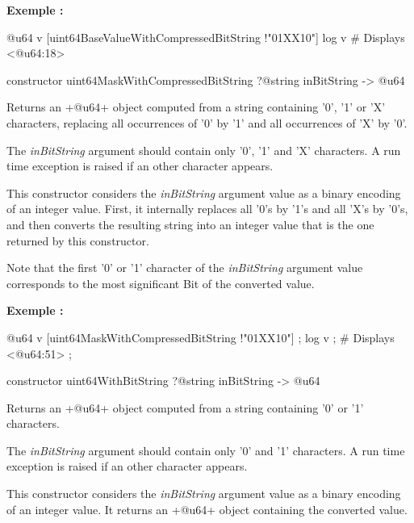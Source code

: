 \textbf{Exemple :}
\begin{galgas4}
@u64 v [uint64BaseValueWithCompressedBitString !"01XX10"]
log v # Displays <@u64:18>
\end{galgas4}






\begin{galgas4}
constructor uint64MaskWithCompressedBitString ?@string inBitString -> @u64
\end{galgas4}


Returns an \ggsq+@u64+ object computed from a string containing '0', '1' or 'X' characters, replacing all occurrences of '0' by '1' and all occurrences of 'X' by '0'.

The \emph{inBitString} argument should contain only '0', '1' and 'X' characters. A run time exception is raised if an other character appears.

This constructor considers the \emph{inBitString} argument value as a binary encoding of an integer value. First, it internally replaces all '0's by '1's and all 'X's by '0's, and then converts the resulting string into an integer value that is the one returned by this constructor.

Note that the first '0' or '1' character of the \emph{inBitString} argument value corresponds to the most significant Bit of the converted value.

\textbf{Exemple :}
\begin{galgas4}
@u64 v [uint64MaskWithCompressedBitString !"01XX10"] ;
log v ; # Displays <@u64:51> ;
\end{galgas4}




\begin{galgas4}
constructor uint64WithBitString ?@string inBitString -> @u64
\end{galgas4}


Returns an \ggsq+@u64+ object computed from a string containing '0' or '1' characters.

The \emph{inBitString} argument should contain only '0' and '1' characters. A run time exception is raised if an other character appears.

This constructor considers the \emph{inBitString} argument value as a binary encoding of an integer value. It returns an \ggsq+@u64+ object containing the converted value.

